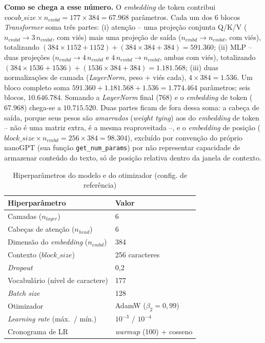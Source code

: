 \documentclass[conference]{IEEEtran}
\begin{document}
\textbf{Como se chega a esse número.} O \textit{embedding} de token contribui
$vocab\_size \times n_{embd} = 177 \times 384 = 67.968$ parâmetros. Cada um
dos 6 blocos \textit{Transformer} soma três partes: (i) atenção -- uma
projeção conjunta Q/K/V ($n_{embd} \rightarrow 3\,n_{embd}$, com viés) mais
uma projeção de saída ($n_{embd} \rightarrow n_{embd}$, com viés), totalizando
$(384{\times}1152 + 1152) + (384{\times}384 + 384) = 591.360$; (ii) MLP --
duas projeções ($n_{embd} \rightarrow 4\,n_{embd}$ e $4\,n_{embd}
\rightarrow n_{embd}$, ambas com viés), totalizando $(384{\times}1536 +
1536) + (1536{\times}384 + 384) = 1.181.568$; (iii) duas normalizações de
camada (\textit{LayerNorm}, peso + viés cada), $4 \times 384 = 1.536$. Um
bloco completo soma $591.360 + 1.181.568 + 1.536 = 1.774.464$ parâmetros;
seis blocos, $10.646.784$. Somando a \textit{LayerNorm} final ($768$) e o
\textit{embedding} de token ($67.968$) chega-se a $\mathbf{10.715.520}$.
Duas partes ficam de fora dessa soma: a cabeça de saída, porque seus pesos
são \emph{amarrados} (\textit{weight tying}) aos do \textit{embedding} de
token -- não é uma matriz extra, é a mesma reaproveitada --, e o
\textit{embedding} de posição ($block\_size \times n_{embd} = 256 \times
384 = 98.304$), excluído por convenção do próprio nanoGPT (sua função
\texttt{get\_num\_params}) por não representar capacidade de armazenar
conteúdo do texto, só de posição relativa dentro da janela de contexto.

\begin{table}[!t]
\centering
\caption{Hiperparâmetros do modelo e do otimizador (config. de referência)}
\label{tab:arch}
\begin{tabular}{@{}ll@{}}
\toprule
Hiperparâmetro & Valor \\
\midrule
Camadas ($n_{layer}$) & 6 \\
Cabeças de atenção ($n_{head}$) & 6 \\
Dimensão do \textit{embedding} ($n_{embd}$) & 384 \\
Contexto ($block\_size$) & 256 caracteres \\
\textit{Dropout} & 0,2 \\
Vocabulário (nível de caractere) & 177 \\
\textit{Batch size} & 128 \\
Otimizador & AdamW ($\beta_2=0{,}99$) \\
\textit{Learning rate} (máx.\ / mín.) & $10^{-3}$ / $10^{-4}$ \\
Cronograma de LR & \textit{warmup} (100) + cosseno \\
\bottomrule
\end{tabular}
\end{table}
\end{document}
